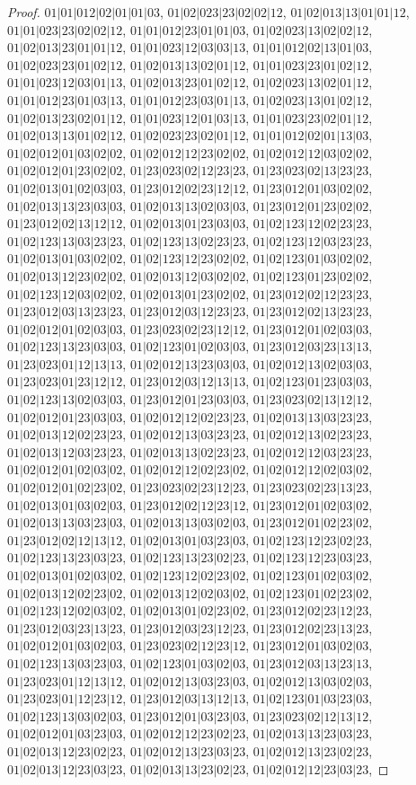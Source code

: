 \documentclass[12pt]{article}
\theoremstyle{plain}
\theoremstyle{definition}
\theoremstyle{remark}
\begin{document}
\begin{proof}
$01|01|012|02|01|01|03$, $01|02|023|23|02|02|12$, $01|02|013|13|01|01|12$, $01|01|023|23|02|02|12$, $01|01|012|23|01|01|03$, $01|02|023|13|02|02|12$, $01|02|013|23|01|01|12$, $01|01|023|12|03|03|13$, $01|01|012|02|13|01|03$, $01|02|023|23|01|02|12$, $01|02|013|13|02|01|12$, $01|01|023|23|01|02|12$, $01|01|023|12|03|01|13$, $01|02|013|23|01|02|12$, $01|02|023|13|02|01|12$, $01|01|012|23|01|03|13$, $01|01|012|23|03|01|13$, $01|02|023|13|01|02|12$, $01|02|013|23|02|01|12$, $01|01|023|12|01|03|13$, $01|01|023|23|02|01|12$, $01|02|013|13|01|02|12$, $01|02|023|23|02|01|12$, $01|01|012|02|01|13|03$, $01|02|012|01|03|02|02$, $01|02|012|12|23|02|02$, $01|02|012|12|03|02|02$, $01|02|012|01|23|02|02$, $01|23|023|02|12|23|23$, $01|23|023|02|13|23|23$, $01|02|013|01|02|03|03$, $01|23|012|02|23|12|12$, $01|23|012|01|03|02|02$, $01|02|013|13|23|03|03$, $01|02|013|13|02|03|03$, $01|23|012|01|23|02|02$, $01|23|012|02|13|12|12$, $01|02|013|01|23|03|03$, $01|02|123|12|02|23|23$, $01|02|123|13|03|23|23$, $01|02|123|13|02|23|23$, $01|02|123|12|03|23|23$, $01|02|013|01|03|02|02$, $01|02|123|12|23|02|02$, $01|02|123|01|03|02|02$, $01|02|013|12|23|02|02$, $01|02|013|12|03|02|02$, $01|02|123|01|23|02|02$, $01|02|123|12|03|02|02$, $01|02|013|01|23|02|02$, $01|23|012|02|12|23|23$, $01|23|012|03|13|23|23$, $01|23|012|03|12|23|23$, $01|23|012|02|13|23|23$, $01|02|012|01|02|03|03$, $01|23|023|02|23|12|12$, $01|23|012|01|02|03|03$, $01|02|123|13|23|03|03$, $01|02|123|01|02|03|03$, $01|23|012|03|23|13|13$, $01|23|023|01|12|13|13$, $01|02|012|13|23|03|03$, $01|02|012|13|02|03|03$, $01|23|023|01|23|12|12$, $01|23|012|03|12|13|13$, $01|02|123|01|23|03|03$, $01|02|123|13|02|03|03$, $01|23|012|01|23|03|03$, $01|23|023|02|13|12|12$, $01|02|012|01|23|03|03$, $01|02|012|12|02|23|23$, $01|02|013|13|03|23|23$, $01|02|013|12|02|23|23$, $01|02|012|13|03|23|23$, $01|02|012|13|02|23|23$, $01|02|013|12|03|23|23$, $01|02|013|13|02|23|23$, $01|02|012|12|03|23|23$, $01|02|012|01|02|03|02$, $01|02|012|12|02|23|02$, $01|02|012|12|02|03|02$, $01|02|012|01|02|23|02$, $01|23|023|02|23|12|23$, $01|23|023|02|23|13|23$, $01|02|013|01|03|02|03$, $01|23|012|02|12|23|12$, $01|23|012|01|02|03|02$, $01|02|013|13|03|23|03$, $01|02|013|13|03|02|03$, $01|23|012|01|02|23|02$, $01|23|012|02|12|13|12$, $01|02|013|01|03|23|03$, $01|02|123|12|23|02|23$, $01|02|123|13|23|03|23$, $01|02|123|13|23|02|23$, $01|02|123|12|23|03|23$, $01|02|013|01|02|03|02$, $01|02|123|12|02|23|02$, $01|02|123|01|02|03|02$, $01|02|013|12|02|23|02$, $01|02|013|12|02|03|02$, $01|02|123|01|02|23|02$, $01|02|123|12|02|03|02$, $01|02|013|01|02|23|02$, $01|23|012|02|23|12|23$, $01|23|012|03|23|13|23$, $01|23|012|03|23|12|23$, $01|23|012|02|23|13|23$, $01|02|012|01|03|02|03$, $01|23|023|02|12|23|12$, $01|23|012|01|03|02|03$, $01|02|123|13|03|23|03$, $01|02|123|01|03|02|03$, $01|23|012|03|13|23|13$, $01|23|023|01|12|13|12$, $01|02|012|13|03|23|03$, $01|02|012|13|03|02|03$, $01|23|023|01|12|23|12$, $01|23|012|03|13|12|13$, $01|02|123|01|03|23|03$, $01|02|123|13|03|02|03$, $01|23|012|01|03|23|03$, $01|23|023|02|12|13|12$, $01|02|012|01|03|23|03$, $01|02|012|12|23|02|23$, $01|02|013|13|23|03|23$, $01|02|013|12|23|02|23$, $01|02|012|13|23|03|23$, $01|02|012|13|23|02|23$, $01|02|013|12|23|03|23$, $01|02|013|13|23|02|23$, $01|02|012|12|23|03|23$, 
\end{proof}
\end{document}
